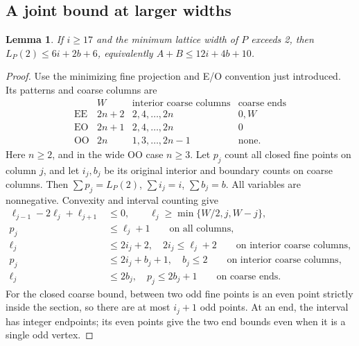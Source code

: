 \documentclass[11pt]{article}
\newtheorem{lemma}[theorem]{Lemma}
\begin{document}
\subsection{A joint bound at larger widths}
\begin{lemma}\label{lem:joint}
If \(i\ge17\) and the minimum lattice width of \(P\) exceeds 2, then
\(L_P(2)\le6i+2b+6\), equivalently \(A+B\le12i+4b+10\).
\end{lemma}
\begin{proof}
Use the minimizing fine projection and E/O convention just introduced.
Its patterns and coarse columns are
\[
\begin{array}{c|c|c|c}
 &W&\text{interior coarse columns}&\text{coarse ends}\\ \hline
\mathrm{EE}&2n+2&2,4,\ldots,2n&0,W\\
\mathrm{EO}&2n+1&2,4,\ldots,2n&0\\
\mathrm{OO}&2n&1,3,\ldots,2n-1&\text{none}.
\end{array}
\]
Here \(n\ge2\), and in the wide OO case \(n\ge3\).
Let \(p_j\) count all closed fine points on column \(j\), and let
\(i_j,b_j\) be its original interior and boundary counts on coarse columns.
Then \(\sum p_j=L_P(2)\), \(\sum i_j=i\), \(\sum b_j=b\).
All variables are nonnegative. Convexity and interval counting give
\begin{align}
 \ell_{j-1}-2\ell_j+\ell_{j+1}&\le0,\qquad \ell_j\ge\min\{W/2,j,W-j\},\label{eq:sectionLP}\\
 p_j&\le\ell_j+1 \qquad\text{on all columns},\nonumber\\
 \ell_j&\le2i_j+2,\quad 2i_j\le\ell_j+2 \qquad\text{on interior coarse columns},\nonumber\\
 p_j&\le2i_j+b_j+1,\quad b_j\le2
 \qquad\text{on interior coarse columns},\label{eq:coarseLP}\\
 \ell_j&\le2b_j,\quad p_j\le2b_j+1
 \qquad\text{on coarse ends}.\label{eq:endLP}
\end{align}
For the closed coarse bound, between two odd fine points is an even point
strictly inside the section, so there are at most \(i_j+1\) odd points.
At an end, the interval has integer endpoints; its even points give the
two end bounds even when it is a single odd vertex.


\end{proof}
\end{document}

